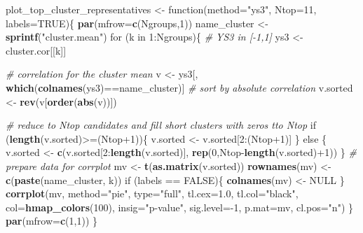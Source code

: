 \documentclass[]{article}
\newenvironment{Shaded}{\begin{snugshade}}{\end{snugshade}}
\newcommand{\KeywordTok}[1]{\textcolor[rgb]{0.13,0.29,0.53}{\textbf{{#1}}}}
\newcommand{\DataTypeTok}[1]{\textcolor[rgb]{0.13,0.29,0.53}{{#1}}}
\newcommand{\DecValTok}[1]{\textcolor[rgb]{0.00,0.00,0.81}{{#1}}}
\newcommand{\FloatTok}[1]{\textcolor[rgb]{0.00,0.00,0.81}{{#1}}}
\newcommand{\StringTok}[1]{\textcolor[rgb]{0.31,0.60,0.02}{{#1}}}
\newcommand{\CommentTok}[1]{\textcolor[rgb]{0.56,0.35,0.01}{\textit{{#1}}}}
\newcommand{\OtherTok}[1]{\textcolor[rgb]{0.56,0.35,0.01}{{#1}}}
\newcommand{\NormalTok}[1]{{#1}}
\begin{document}
\begin{Shaded}
\begin{Highlighting}[]
\NormalTok{plot_top_cluster_representatives <-}\StringTok{ }\NormalTok{function(}\DataTypeTok{method=}\StringTok{"ys3"}\NormalTok{, }\DataTypeTok{Ntop=}\DecValTok{11}\NormalTok{, }\DataTypeTok{labels=}\OtherTok{TRUE}\NormalTok{)\{}
  \KeywordTok{par}\NormalTok{(}\DataTypeTok{mfrow=}\KeywordTok{c}\NormalTok{(Ngroups,}\DecValTok{1}\NormalTok{))}
  \NormalTok{name_cluster <-}\StringTok{ }\KeywordTok{sprintf}\NormalTok{(}\StringTok{"cluster.mean"}\NormalTok{)}
  \NormalTok{for (k in }\DecValTok{1}\NormalTok{:Ngroups)\{}
      \CommentTok{# YS3 in [-1,1]}
      \NormalTok{ys3 <-}\StringTok{ }\NormalTok{cluster.cor[[k]]}
  
      \CommentTok{# correlation for the cluster mean}
      \NormalTok{v <-}\StringTok{ }\NormalTok{ys3[, }\KeywordTok{which}\NormalTok{(}\KeywordTok{colnames}\NormalTok{(ys3)==name_cluster)]}
      \CommentTok{# sort by absolute correlation}
      \NormalTok{v.sorted <-}\StringTok{ }\KeywordTok{rev}\NormalTok{(v[}\KeywordTok{order}\NormalTok{(}\KeywordTok{abs}\NormalTok{(v))])}

      \CommentTok{# reduce to Ntop candidates and fill short clusters with zeros tto Ntop}
      \NormalTok{if (}\KeywordTok{length}\NormalTok{(v.sorted)>=(Ntop}\DecValTok{+1}\NormalTok{))\{}
        \NormalTok{v.sorted <-}\StringTok{ }\NormalTok{v.sorted[}\DecValTok{2}\NormalTok{:(Ntop}\DecValTok{+1}\NormalTok{)]}
      \NormalTok{\} else \{}
        \NormalTok{v.sorted <-}\StringTok{ }\KeywordTok{c}\NormalTok{(v.sorted[}\DecValTok{2}\NormalTok{:}\KeywordTok{length}\NormalTok{(v.sorted)], }\KeywordTok{rep}\NormalTok{(}\DecValTok{0}\NormalTok{,Ntop-}\KeywordTok{length}\NormalTok{(v.sorted)+}\DecValTok{1}\NormalTok{))}
      \NormalTok{\}}
      \CommentTok{# prepare data for corrplot}
      \NormalTok{mv <-}\StringTok{ }\KeywordTok{t}\NormalTok{(}\KeywordTok{as.matrix}\NormalTok{(v.sorted))}
      \KeywordTok{rownames}\NormalTok{(mv) <-}\StringTok{ }\KeywordTok{c}\NormalTok{(}\KeywordTok{paste}\NormalTok{(name_cluster, k))}
      \NormalTok{if (labels ==}\StringTok{ }\OtherTok{FALSE}\NormalTok{)\{}
        \KeywordTok{colnames}\NormalTok{(mv) <-}\StringTok{ }\OtherTok{NULL}
      \NormalTok{\}}
      \KeywordTok{corrplot}\NormalTok{(mv, }\DataTypeTok{method=}\StringTok{"pie"}\NormalTok{, }\DataTypeTok{type=}\StringTok{"full"}\NormalTok{, }
             \DataTypeTok{tl.cex=}\FloatTok{1.0}\NormalTok{, }\DataTypeTok{tl.col=}\StringTok{"black"}\NormalTok{, }\DataTypeTok{col=}\KeywordTok{hmap_colors}\NormalTok{(}\DecValTok{100}\NormalTok{), }
             \DataTypeTok{insig=}\StringTok{"p-value"}\NormalTok{, }\DataTypeTok{sig.level=}\NormalTok{-}\DecValTok{1}\NormalTok{, }\DataTypeTok{p.mat=}\NormalTok{mv,}
             \DataTypeTok{cl.pos=}\StringTok{"n"}\NormalTok{)}
  \NormalTok{\}}
  \KeywordTok{par}\NormalTok{(}\DataTypeTok{mfrow=}\KeywordTok{c}\NormalTok{(}\DecValTok{1}\NormalTok{,}\DecValTok{1}\NormalTok{))}
\NormalTok{\}}


\end{Highlighting}
\end{Shaded}
\end{document}
